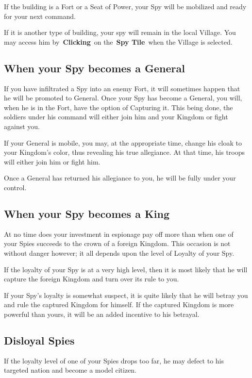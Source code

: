 If the building is a Fort or a Seat of Power, your Spy will be mobilized and ready for your next command.

If it is another type of building, your spy will remain in the local Village. You may access him by \textbf{Clicking} on the \textbf{Spy Tile} when the Village is selected.

\subsection{When your Spy becomes a General}

If you have infiltrated a Spy into an enemy Fort, it will sometimes happen that he will be promoted to General. Once your Spy has become a General, you will, when he is in the Fort, have the option of Capturing it. This being done, the soldiers under his command will either join him and your Kingdom or fight against you.

If your General is mobile, you may, at the appropriate time, change his cloak to your Kingdom’s color, thus revealing his true allegiance. At that time, his troops will either join him or fight him.

Once a General has returned his allegiance to you, he will be fully under your control.

\subsection{When your Spy becomes a King}

At no time does your investment in espionage pay off more than when one of your Spies succeeds to the crown of a foreign Kingdom. This occasion is not without danger however; it all depends upon the level of Loyalty of your Spy.

If the loyalty of your Spy is at a very high level, then it is most likely that he will capture the foreign Kingdom and turn over its rule to you.

If your Spy’s loyalty is somewhat suspect, it is quite likely that he will betray you and rule the captured Kingdom for himself. If the captured Kingdom is more powerful than yours, it will be an added incentive to his betrayal.

\subsection{Disloyal Spies}

If the loyalty level of one of your Spies drops too far, he may defect to his targeted nation and become a model citizen.

